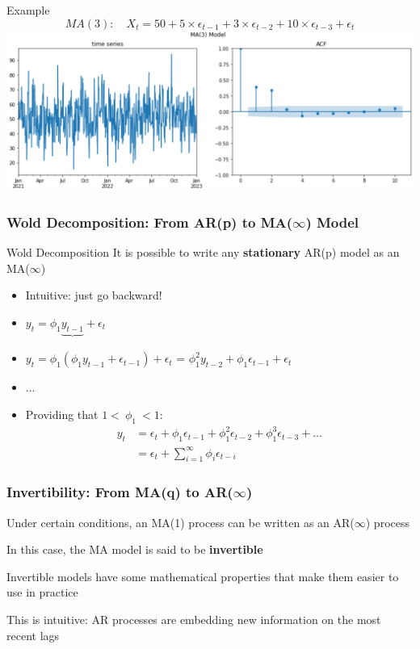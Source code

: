 \documentclass{beamer}
\newenvironment{wideitemize}{\itemize\addtolength{\itemsep}{10pt}}{\enditemize}
\begin{document}
\begin{frame}{Example}
$$MA(3):\quad X_t = 50 +5\times\epsilon_{t-1}+3\times\epsilon_{t-2}+ 10\times\epsilon_{t-3}+\epsilon_{t}$$
\vspace{2pt}
\includegraphics[width=\textwidth]{static/course_2_img/MA_ACF.png}
    
\end{frame}


\begin{frame}
  \frametitle{Wold Decomposition: From AR(p) to MA($\infty$) Model}

  \begin{block}{Wold Decomposition}
    It is possible to write any \textbf{stationary} AR(p) model as an MA($\infty$)
  \end{block}

  \begin{itemize}
  \item Intuitive: just go backward!
  \item $y_t = \phi_1 \underbrace{y_{t-1}}_{} + \epsilon_t$
  \item $y_t = \phi_1 (\phi_1 y_{t-1} + \epsilon_{t-1}) + \epsilon_t$ = $\phi_1^2 y_{t-2} + \phi_1\epsilon_{t-1} + \epsilon_t$
  \item $\dots$
  \item Providing that $1 < \ \phi_1 \ < 1$:
    \begin{align*}
      y_t &= \epsilon_t + \phi_1 \epsilon_{t-1} + \phi_1^2 \epsilon_{t-2} + \phi_1^3 \epsilon_{t-3} + \dots\\
      &= \epsilon_t + \sum_{i=1}^{\infty} { \phi_i \epsilon_{t-i}} 
    \end{align*}
  \end{itemize}  
\end{frame}


\begin{frame}
  \frametitle{Invertibility: From MA(q) to AR($\infty$)}

  \begin{wideitemize}
    \item Under certain conditions, an MA(1) process can be written as an AR($\infty$) process
    \item In this case, the MA model is said to be \textbf{invertible}
    \item Invertible models have some mathematical properties that make them easier to use in practice
    \item This is intuitive: AR processes are embedding new information on the most recent lags 

  \end{wideitemize}
  
\end{frame}
\end{document}
